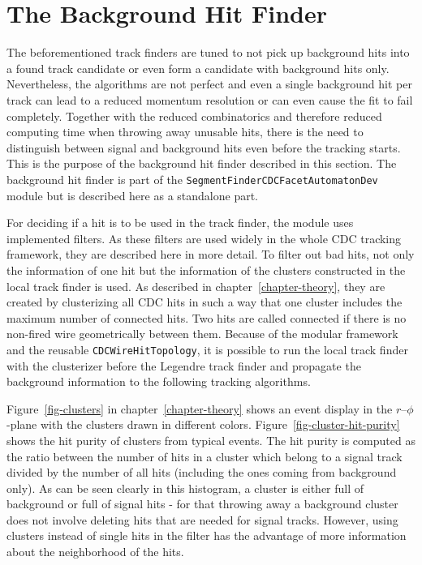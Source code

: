 \section{The Background Hit Finder} \label{section-background}
The beforementioned track finders are tuned to not pick up background hits into a found track candidate or even form a candidate with background hits only. Nevertheless, the algorithms are not perfect and even a single background hit per track can lead to a reduced momentum resolution or can even cause the fit to fail completely. Together with the reduced combinatorics and therefore reduced computing time when throwing away unusable hits, there is the need to distinguish between signal and background hits even before the tracking starts. This is the purpose of the background hit finder described in this section. The background hit finder is part of the \texttt{SegmentFinderCDCFacetAutomatonDev} module but is described here as a standalone part.

For deciding if a hit is to be used in the track finder, the module uses implemented filters. As these filters are used widely in the whole CDC tracking framework, they are described here in more detail. To filter out bad hits, not only the information of one hit but the information of the clusters constructed in the local track finder is used. As described in chapter~\ref{chapter-theory}, they are created by clusterizing all CDC hits in such a way that one cluster includes the maximum number of connected hits. Two hits are called connected if there is no non-fired wire geometrically between them. Because of the modular framework and the reusable \texttt{CDCWireHitTopology}, it is possible to run the local track finder with the clusterizer before the Legendre track finder and propagate the background information to the following tracking algorithms. 

Figure~\ref{fig-clusters} in chapter~\ref{chapter-theory} shows an event display in the $r$--$\phi$-plane with the clusters drawn in different colors. Figure~\ref{fig-cluster-hit-purity} shows the hit purity of clusters from typical events. The hit purity is computed as the ratio between the number of hits in a cluster which belong to a signal track divided by the number of all hits (including the ones coming from background only). As can be seen clearly in this histogram, a cluster is either full of background or full of signal hits - for that throwing away a background cluster does not involve deleting hits that are needed for signal tracks. However, using clusters instead of single hits in the filter has the advantage of more information about the neighborhood of the hits.

